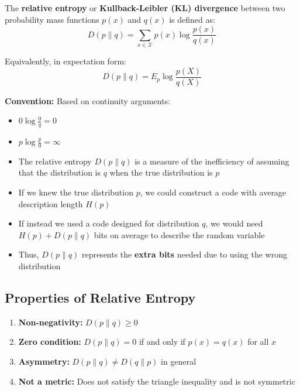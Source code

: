 \documentclass[11pt,a4paper]{book}
\newenvironment{definitionbox}[1][Definition]{
    \begin{tcolorbox}[
        enhanced,
        breakable,
        colback=primaryblue!10,
        colframe=primaryblue!150,
        title=#1,
        fonttitle=\bfseries,
        sharp corners,
        boxrule=0.8pt,
        left=8pt,
        right=8pt,
        top=6pt,
        bottom=6pt
    ]
}{
    \end{tcolorbox}
}
\newenvironment{infobox}[1][For more understanding]{
    \begin{tcolorbox}[
        enhanced,
        breakable,
        colback=mintgreen!10,
        colframe=mintgreen!200,
        title=#1,
        fonttitle=\bfseries,
        sharp corners,
        boxrule=0.8pt,
        left=8pt,
        right=8pt,
        top=6pt,
        bottom=6pt
    ]
}{
    \end{tcolorbox}
}
\begin{document}
\begin{definitionbox}[Relative Entropy(Kullback-Leibler Divergence)]
    The \textbf{relative entropy} or \textbf{Kullback-Leibler (KL) divergence} between two probability mass functions \(p(x)\) and \(q(x)\) is defined as:
    \[
    D(p \| q) = \sum_{x \in \mathcal{X}} p(x) \log \frac{p(x)}{q(x)}
    \]
    
    Equivalently, in expectation form:
    \[
    D(p \| q) = E_p \log \frac{p(X)}{q(X)}
    \]
    
    \textbf{Convention:} Based on continuity arguments:
    \begin{itemize}
        \item \(0 \log \frac{0}{q} = 0\)
        \item \(p \log \frac{p}{0} = \infty\)
    \end{itemize}
\end{definitionbox}

\begin{infobox}[Interpretation of Relative Entropy (Coding Perspective)]
    \begin{itemize}
        \item The relative entropy \(D(p \| q)\) is a measure of the inefficiency of assuming that the distribution is \(q\) when the true distribution is \(p\)
        \item If we knew the true distribution \(p\), we could construct a code with average description length \(H(p)\)
        \item If instead we used a code designed for distribution \(q\), we would need \(H(p) + D(p \| q)\) bits on average to describe the random variable
        \item Thus, \(D(p \| q)\) represents the \textbf{extra bits} needed due to using the wrong distribution
    \end{itemize}
\end{infobox}

\subsection{Properties of Relative Entropy}
    \begin{enumerate}
        \item \textbf{Non-negativity:} \(D(p \| q) \geq 0\)
        \item \textbf{Zero condition:} \(D(p \| q) = 0\) if and only if \(p(x) = q(x)\) for all \(x\)
        \item \textbf{Asymmetry:} \(D(p \| q) \neq D(q \| p)\) in general
        \item \textbf{Not a metric:} Does not satisfy the triangle inequality and is not symmetric
    \end{enumerate}
    
\end{document}
